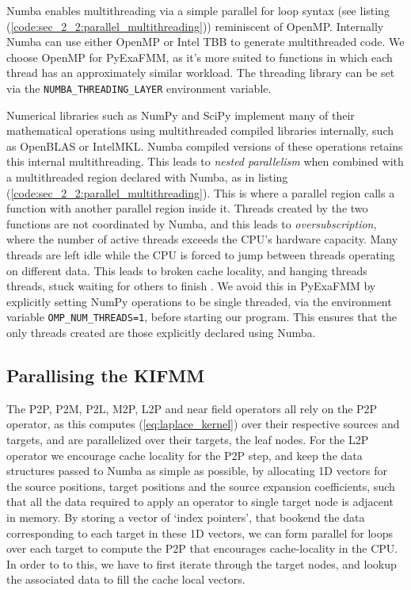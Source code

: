 Numba enables multithreading via a simple parallel for loop syntax (see listing (\ref{code:sec_2_2:parallel_multithreading})) reminiscent of OpenMP. Internally Numba can use either OpenMP or Intel TBB to generate multithreaded code. We choose OpenMP for PyExaFMM, as it's more suited to functions in which each thread has an approximately similar workload. The threading library can be set via the \lstinline{NUMBA_THREADING_LAYER} environment variable.

Numerical libraries such as NumPy and SciPy implement many of their mathematical operations using multithreaded compiled libraries internally, such as OpenBLAS or IntelMKL. Numba compiled versions of these operations retains this internal multithreading. This leads to \textit{nested parallelism} when combined with a multithreaded region declared with Numba, as in listing (\ref{code:sec_2_2:parallel_multithreading}). This is where a parallel region calls a function with another parallel region inside it. Threads created by the two functions are not coordinated by Numba, and this leads to \textit{oversubscription}, where the number of active threads exceeds the CPU's hardware capacity. Many threads are left idle while the CPU is forced to jump between threads operating on different data. This leads to broken cache locality, and hanging threads threads, stuck waiting for others to finish \cite{malakhov2016python}. We avoid this in PyExaFMM by explicitly setting NumPy operations to be single threaded, via the environment variable \lstinline{OMP_NUM_THREADS=1}, before starting our program. This ensures that the only threads created are those explicitly declared using Numba.

\subsection*{Parallising the KIFMM}


The P2P, P2M, P2L, M2P, L2P and near field operators all rely on the P2P operator, as this computes (\ref{eq:laplace_kernel}) over their respective sources and targets, and are parallelized over their targets, the leaf nodes. For the L2P operator we encourage cache locality for the P2P step, and keep the data structures passed to Numba as simple as possible, by allocating 1D vectors for the source positions, target positions and the source expansion coefficients, such that all the data required to apply an operator to single target node is adjacent in memory. By storing a vector of `index pointers', that bookend the data corresponding to each target in these 1D vectors, we can form parallel for loops over each target to compute the P2P that encourages cache-locality in the CPU. In order to to this, we have to first iterate through the target nodes, and lookup the associated data to fill the cache local vectors.

